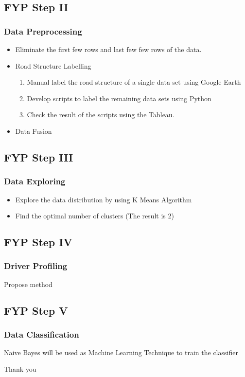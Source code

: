 \documentclass{beamer}
\begin{document}
\subsection{FYP Step II}
\begin{frame}
\frametitle{Data Preprocessing}
\begin{itemize}
\item Eliminate the first few rows and last few few rows of the data.
\item Road Structure Labelling
	\begin{enumerate}
	\item Manual label the road structure of a single data set using Google Earth
	\item Develop scripts to label the remaining data sets using Python
	\item Check the result of the scripts using the Tableau.
	\end{enumerate}

\item Data Fusion
\end{itemize}
\end{frame}

\subsection{FYP Step III}
\begin{frame}
\frametitle{Data Exploring}
\begin{itemize}
\item Explore the data distribution by using K Means Algorithm
\item Find the optimal number of clusters (The result is 2)
\end{itemize}
\end{frame}

\subsection{FYP Step IV}
\begin{frame}
\frametitle{Driver Profiling}
Propose method
\end{frame}

\subsection{FYP Step V}
\begin{frame}
\frametitle{Data Classification}
Naive Bayes will be used as Machine Learning Technique to train the classifier
\end{frame}

\begin{frame}
Thank you
\end{frame}
\end{document}
